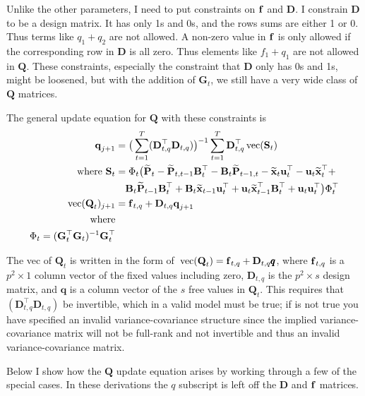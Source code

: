 \documentclass[]{article}
\def\BB{\mbox{$\mathbf B$}}	\def\bb{\mbox{$\mathbf b$}}
\def\DD{\mbox{$\mathbf D$}}	\def\dd{\mbox{$\mathbf d$}}
\def\GG{\mbox{$\mathbf G$}}	\def\gg{\mbox{$\mathbf g$}}
\def\PP{\mbox{$\mathbf P$}}  \def\pp{\mbox{$\mathbf p$}}
\def\QQ{\mbox{$\mathbf Q$}}	 \def\qq{\mbox{$\mathbf q$}}
\def\SS{\mbox{$\mathbf S$}}
\def\vec{\,\textup{\textrm{vec}}}
\def\hatxt{\widetilde{\mbox{$\mathbf x$}}_t}
\def\hatxtm{\widetilde{\mbox{$\mathbf x$}}_{t-1}}
\def\hatPt{\widetilde{\PP}_t}
\def\hatPtm{\widetilde{\PP}_{t-1}}
\def\hatPttm{\widetilde{\PP}_{t,t-1}}
\def\hatPtmt{\widetilde{\PP}_{t-1,t}}
\begin{document}
Unlike the other parameters, I need to put constraints on $\mbox{$\mathbf f$}$ and $\DD$.  I constrain $\DD$ to be a design matrix.  It has only 1s and 0s, and the rows sums are either 1 or 0. Thus terms like $q_1+q_2$ are not allowed.  A non-zero value in $\mbox{$\mathbf f$}$ is only allowed if the corresponding row in $\DD$ is all zero.  Thus elements like $f_1+q_1$ are not allowed in $\QQ$.  These constraints, especially the constraint that $\DD$ only has 0s and 1s, might be loosened, but with the addition of $\GG_t$, we still have a very wide class of $\QQ$ matrices.

The general update equation for $\QQ$ with these constraints is
\begin{equation}\label{eq:Q.general}
\begin{split}
\qq_{j+1} &= \big(\sum_{t=1}^T(\DD_{t,q}^\top\DD_{t,q})\big)^{-1} \sum_{t=1}^T\DD_{t,q}^\top\vec(\SS_t)\\
\text{where }\SS_t&=\Phi_t\big(\hatPt - \hatPttm \BB_t^\top - \BB_t\hatPtmt 
- \hatxt\uu_t^\top - \uu_t\hatxt^\top + \\
&\quad \BB_t\hatPtm\BB_t^\top + \BB_t\hatxtm\uu_t^\top + \uu_t\hatxtm^\top\BB_t^\top + \uu_t\uu_t^\top \big)\Phi_t^\top\\
\vec(\QQ_t)_{j+1}&=\ff_{t,q}+\DD_{t,q}\qq_{j+1} \\
\text{where}\\
\Phi_t = (\GG_t^\top\GG_t)^{-1}\GG_t^\top
\end{split}
\end{equation}

The vec of $\QQ_t$ is written in the form of $\vec(\QQ_t) = \ff_{t,q} + \DD_{t,q} \pmb{q}$, where $\mbox{$\mathbf f$}_{t,q}$ is a $p^2 \times 1$ column vector of the fixed values including zero, $\DD_{t,q}$ is the $p^2 \times s$ design matrix, and $\pmb{q}$ is a column vector of the $s$ free values in $\QQ_t$.  This requires that $(\DD_{t,q}^\top\DD_{t,q})$ be invertible, which in a valid model must be true; if is not true you have specified an invalid variance-covariance structure since the implied variance-covariance matrix will not be full-rank and not invertible and thus an invalid variance-covariance matrix.

Below I show how the $\QQ$ update equation arises by working through a few of the special cases.  In these derivations the $q$ subscript is left off the $\DD$ and $\mbox{$\mathbf f$}$ matrices.
\end{document}
